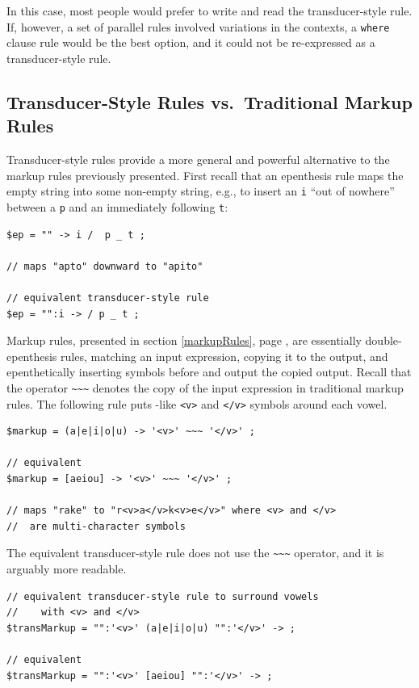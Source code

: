 \noindent In this case, most people would prefer to write and read the
transducer-style rule.  If, however, a set of parallel rules involved
variations in the contexts, a \texttt{where} clause rule would be the
best option, and it could not be re-expressed as a transducer-style
rule.


\subsection{Transducer-Style Rules vs.\ Traditional Markup Rules}

Transducer-style rules provide a more general and powerful alternative
to the markup rules previously presented.  First recall that an
epenthesis rule maps the empty string into some non-empty string, e.g.,
to insert an \verb!i! ``out of nowhere'' between a \verb!p! and an
immediately following \verb!t!:

\begin{Verbatim}
$ep = "" -> i /  p _ t ;

// maps "apto" downward to "apito"

// equivalent transducer-style rule
$ep = "":i -> / p _ t ;
\end{Verbatim}


Markup rules, presented in section \ref{markupRules}, page
\pageref{markupRules}, are essentially double-epenthesis rules,
matching an input expression, copying it to the output, and
epenthetically inserting symbols before and output the copied output.
Recall that the operator \verb!~~~! denotes the copy of the input
expression in traditional markup rules.  The following rule puts -like \verb!<v>! and
\verb!</v>! symbols around each vowel.

\begin{Verbatim}
$markup = (a|e|i|o|u) -> '<v>' ~~~ '</v>' ;

// equivalent
$markup = [aeiou] -> '<v>' ~~~ '</v>' ;

// maps "rake" to "r<v>a</v>k<v>e</v>" where <v> and </v>
//	are multi-character symbols
\end{Verbatim}

The equivalent transducer-style rule does not use the \verb!~~~!
operator, and it is arguably more readable.

\begin{Verbatim}
// equivalent transducer-style rule to surround vowels 
//    with <v> and </v>
$transMarkup = "":'<v>' (a|e|i|o|u) "":'</v>' -> ;

// equivalent
$transMarkup = "":'<v>' [aeiou] "":'</v>' -> ;
\end{Verbatim}

